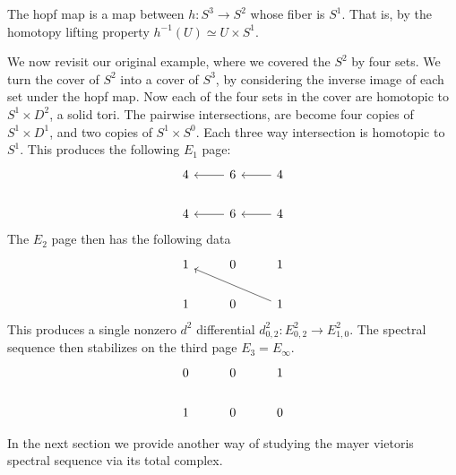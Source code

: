 The hopf map is a map between $h: S^3 \rightarrow S^2$ whose fiber is $S^1$. That is, by the homotopy lifting property $h^{-1}(U) \simeq U \times S^1$. 
\begin{example}
We now revisit our original example, where we covered the $S^2$ by four sets. We turn the cover of $S^2$ into a cover of $S^3$, by considering the inverse image of each set under the hopf map. Now each of the four sets in the cover are homotopic to $S^1 \times D^2$, a solid tori. The pairwise intersections, are become four copies of $S^1 \times D^1$, and two copies of $S^1 \times S^0$. Each three way intersection is homotopic to $S^1$.
This produces the following $E_1$ page:
\[ \begin{tikzcd}
4    &  \arrow{l} 6     & \arrow{l}   4   \\
4    & \arrow{l}  6     & \arrow{l}   4
\end{tikzcd} \]
The $E_2$ page then has the following data
\[
\begin{tikzcd}
1    &  0     &   1   \\
1   &  0     &   \arrow{llu}1
\end{tikzcd} 
\]
This produces a single nonzero $d^2$ differential $d^2_{0,2}: E^2_{0,2} \rightarrow E^2_{1,0}$.
The spectral sequence then stabilizes on the third page $E_3 = E_\infty$.
\[
\begin{tikzcd}
0    &  0     &   1   \\
1   &  0     &    0
\end{tikzcd} 
\]
\end{example}

In the next section we provide another way of studying the mayer vietoris spectral sequence via its total complex. 